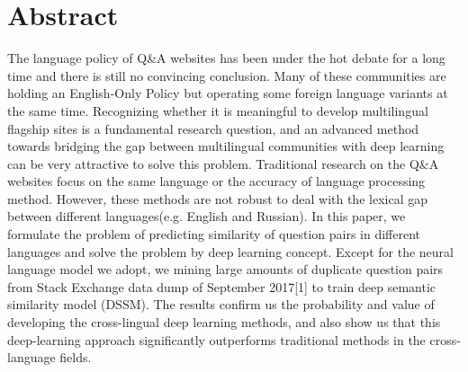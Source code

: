 
\chapter*{Abstract}
\label{cha:abstract}

The language policy of Q\&A websites has been under the hot debate for a long time and there is still no convincing conclusion. Many of these communities are holding an English-Only Policy but operating some foreign language variants at the same time. Recognizing whether it is meaningful to develop multilingual flagship sites is a fundamental research question, and an advanced method towards bridging the gap between multilingual communities with deep learning can be very attractive to solve this problem. Traditional research on the Q\&A websites focus on the same language or the accuracy of language processing method. However, these methods are not robust to deal with the lexical gap between different languages(e.g. English and Russian). In this paper, we formulate the problem of predicting similarity of question pairs in different languages and solve the problem by deep learning concept. Except for the neural language model we adopt, we mining large amounts of duplicate question pairs from Stack Exchange data dump of September 2017[1] to train deep semantic similarity model (DSSM). The results confirm us the probability and value of developing the cross-lingual deep learning methods, and also show us that this deep-learning approach significantly outperforms traditional methods in the cross-language fields.

